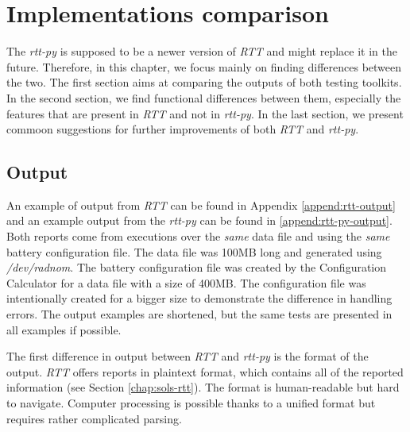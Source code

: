\documentclass[
  digital,     %
  oneside,     %
  nosansbold,  %
  nocolorbold, %
  nolof,         %
  nolot,         %
]{fithesis4}
\begin{document}





\chapter{Implementations comparison} \label{chap:comparison}

The \emph{rtt-py} is supposed to be a newer version of \emph{RTT} and might replace it in the future. Therefore, in this chapter, we focus mainly on finding differences between the two. The first section aims at comparing the outputs of both testing toolkits. In the second section, we find functional differences between them, especially the features that are present in \emph{RTT} and not in \emph{rtt-py}. In the last section, we present commoon suggestions for further improvements of both \emph{RTT} and \emph{rtt-py}. 

\section{Output} \label{chap:comparison-output}
An example of output from \emph{RTT} can be found in Appendix \ref{append:rtt-output} and an example output from the \emph{rtt-py} can be found in \ref{append:rtt-py-output}. Both reports come from executions over the \emph{same} data file and using the \emph{same} battery configuration file. The data file was 100MB long and generated using \emph{/dev/radnom}. The battery configuration file was created by the Configuration Calculator for a data file with a size of 400MB.  The configuration file was intentionally created for a bigger size to demonstrate the difference in handling errors. The output examples are shortened, but the same tests are presented in all examples if possible.

The first difference in output between \emph{RTT} and \emph{rtt-py} is the format of the output. \emph{RTT} offers reports in plaintext format, which contains all of the reported information (see Section \ref{chap:sols-rtt}). The format is human-readable but hard to navigate. Computer processing is possible thanks to a unified format but requires rather complicated parsing.
\end{document}
